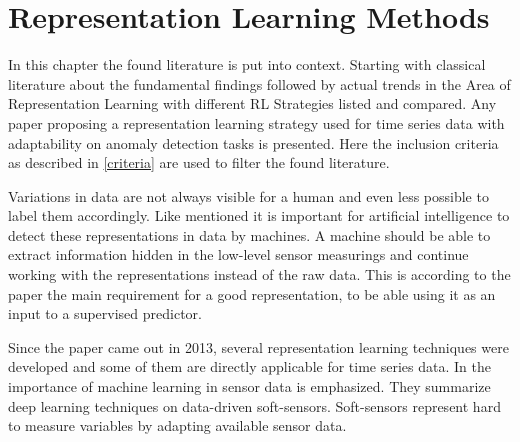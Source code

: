 \section{Representation Learning Methods}\label{review}
In this chapter the found literature is put into context. Starting with classical literature about the fundamental findings followed by actual trends in the Area of Representation Learning with different RL Strategies listed and compared. Any paper proposing a representation learning strategy used for time series data with adaptability on anomaly detection tasks is presented. Here the inclusion criteria as described in \ref{criteria} are used to filter the found literature.

Variations in data are not always visible for a human and even less possible to label them accordingly. Like  mentioned it is important for artificial intelligence to detect these representations in data by machines. A machine should be able to extract information hidden in the low-level sensor measurings and continue working with the representations instead of the raw data. This is according to the paper the main requirement for a good representation, to be able using it as an input to a supervised predictor.

Since the paper came out in 2013, several representation learning techniques were developed and some of them are directly applicable for time series data. In  the importance of machine learning in sensor data is emphasized. They summarize deep learning techniques on data-driven soft-sensors. Soft-sensors represent hard to measure variables by adapting available sensor data.%

